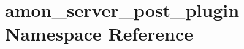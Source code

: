\hypertarget{namespaceamon__server__post__plugin}{\section{amon\-\_\-server\-\_\-post\-\_\-plugin Namespace Reference}
\label{namespaceamon__server__post__plugin}
}
